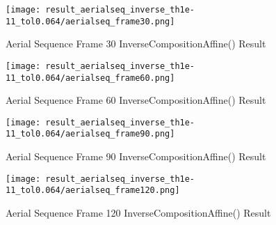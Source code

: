 \documentclass{article}
\begin{document}
	\begin{figure}[H]
	\centering
	\begin{minipage}[b]{0.45\textwidth}
		\centering
		\texttt{[image: result\_aerialseq\_inverse\_th1e-11\_tol0.064/aerialseq\_frame30.png]}  %
		\caption{Aerial Sequence Frame 30 InverseCompositionAffine() Result}
		\label{fig:Q3_1_frame_30_result}
	\end{minipage}
	\hfill  %
	\begin{minipage}[b]{0.45\textwidth}
		\centering
		\texttt{[image: result\_aerialseq\_inverse\_th1e-11\_tol0.064/aerialseq\_frame60.png]}  %
		\caption{Aerial Sequence Frame 60 InverseCompositionAffine() Result}
		\label{fig:Q3_1_frame_60_result}
	\end{minipage}	
	\end{figure}
	\begin{figure}[H]
	\centering
	\begin{minipage}[b]{0.45\textwidth}
		\centering
		\texttt{[image: result\_aerialseq\_inverse\_th1e-11\_tol0.064/aerialseq\_frame90.png]}  %
		\caption{Aerial Sequence Frame 90 InverseCompositionAffine() Result}
		\label{fig:Q3_1_frame_90_result}
	\end{minipage}
	\hfill  %
	\begin{minipage}[b]{0.45\textwidth}
		\centering
		\texttt{[image: result\_aerialseq\_inverse\_th1e-11\_tol0.064/aerialseq\_frame120.png]}  %
		\caption{Aerial Sequence Frame 120 InverseCompositionAffine() Result}
		\label{fig:Q3_1_frame_120_result}
	\end{minipage}	
	\end{figure}	
	
\end{document}
